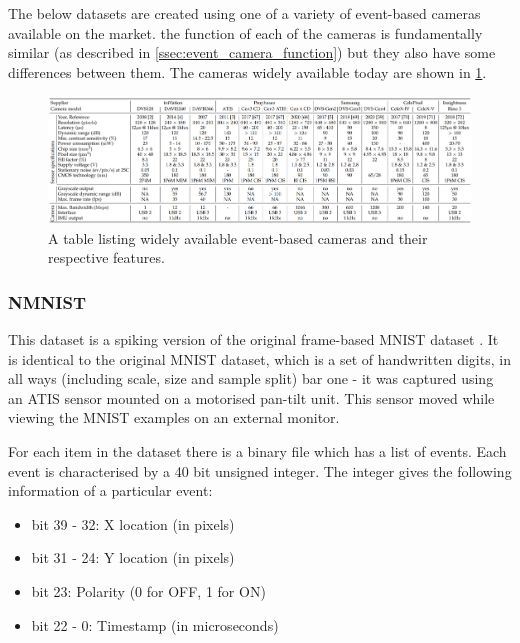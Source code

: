 The below datasets are created using one of a variety of event-based cameras available on the market. the function of each of the cameras is fundamentally similar (as described in \cref{ssec:event_camera_function}) but they also have some differences between them. The cameras widely available today are shown in \cref{fig:camera_models}.

\begin{figure}[htb]
      \centering
      \includegraphics[width=\textwidth]{background/images/camera_models.png}
      \caption{A table listing widely available event-based cameras and their respective features\cite{EventBasedVisionASurvery}.}
      \label{fig:camera_models}
\end{figure}

\subsubsection{NMNIST} \label{sssec:nmnist}

This dataset is a spiking version of the original frame-based MNIST dataset \cite{MNIST}\cite{NMNIST}. It is identical to the original MNIST dataset, which is a set of handwritten digits, in all ways (including scale, size and sample split) bar one - it was captured using an ATIS sensor mounted on a motorised pan-tilt unit. This sensor moved while viewing the MNIST examples on an external monitor.

For each item in the dataset there is a binary file which has a list of events. Each event is characterised by a 40 bit unsigned integer. The integer gives the following information of a particular event:

\begin{itemize}
      \item bit 39 - 32: X location (in pixels)
      \item bit 31 - 24: Y location (in pixels)
      \item bit 23: Polarity (0 for OFF, 1 for ON)
      \item bit 22 - 0: Timestamp (in microseconds)
\end{itemize}


